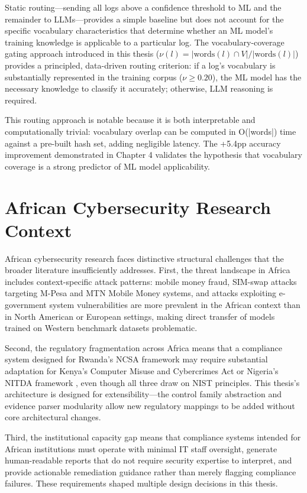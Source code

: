 \documentclass[12pt,oneside]{report}
\begin{document}
Static routing—sending all logs above a confidence threshold to ML and the remainder to LLMs—provides a simple baseline but does not account for the specific vocabulary characteristics that determine whether an ML model's training knowledge is applicable to a particular log. The vocabulary-coverage gating approach introduced in this thesis ($\nu(l) = |\text{words}(l) \cap V| / |\text{words}(l)|$) provides a principled, data-driven routing criterion: if a log's vocabulary is substantially represented in the training corpus ($\nu \geq 0.20$), the ML model has the necessary knowledge to classify it accurately; otherwise, LLM reasoning is required.

This routing approach is notable because it is both interpretable and computationally trivial: vocabulary overlap can be computed in O(|words|) time against a pre-built hash set, adding negligible latency. The +5.4pp accuracy improvement demonstrated in Chapter 4 validates the hypothesis that vocabulary coverage is a strong predictor of ML model applicability.

\section{African Cybersecurity Research Context}

African cybersecurity research faces distinctive structural challenges that the broader literature insufficiently addresses. First, the threat landscape in Africa includes context-specific attack patterns: mobile money fraud, SIM-swap attacks targeting M-Pesa and MTN Mobile Money systems, and attacks exploiting e-government system vulnerabilities are more prevalent in the African context than in North American or European settings, making direct transfer of models trained on Western benchmark datasets problematic.

Second, the regulatory fragmentation across Africa means that a compliance system designed for Rwanda's NCSA framework may require substantial adaptation for Kenya's Computer Misuse and Cybercrimes Act \cite{kenya_cyber_law} or Nigeria's NITDA framework \cite{nigeria_cyber}, even though all three draw on NIST principles. This thesis's architecture is designed for extensibility—the control family abstraction and evidence parser modularity allow new regulatory mappings to be added without core architectural changes.

Third, the institutional capacity gap means that compliance systems intended for African institutions must operate with minimal IT staff oversight, generate human-readable reports that do not require security expertise to interpret, and provide actionable remediation guidance rather than merely flagging compliance failures. These requirements shaped multiple design decisions in this thesis.
\end{document}
